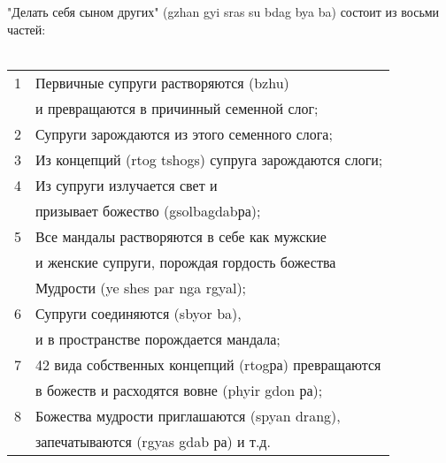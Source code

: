 "Делать себя сыном других" (gzhan gyi sras su bdag bya ba) состоит из восьми частей:\\
\\
\begin{tabular}{ll}
1 & Первичные супруги растворяются (bzhu) \\
  & и превращаются в причинный семенной слог;\\
2 & Супруги зарождаются из этого семенного слога;\\
3 & Из концепций (rtog tshogs) супруга зарождаются слоги;\\
4 & Из супруги излучается свет и \\
  & призывает божество (gsolbagdabра);\\
5 & Все мандалы растворяются в себе как мужские \\
  & и женские супруги, порождая гордость божества \\
  & Мудрости (ye shes par nga rgyal);\\
6 & Супруги соединяются (sbyor ba), \\
  & и в пространстве порождается мандала;\\
7 & 42 вида собственных концепций (rtogра) превращаются\\
  &  в божеств и расходятся вовне (phyir gdon ра);\\
8 & Божества мудрости приглашаются (spyan drang), \\
  & запечатываются (rgyas gdab ра) и т.д.\\
\end{tabular}

